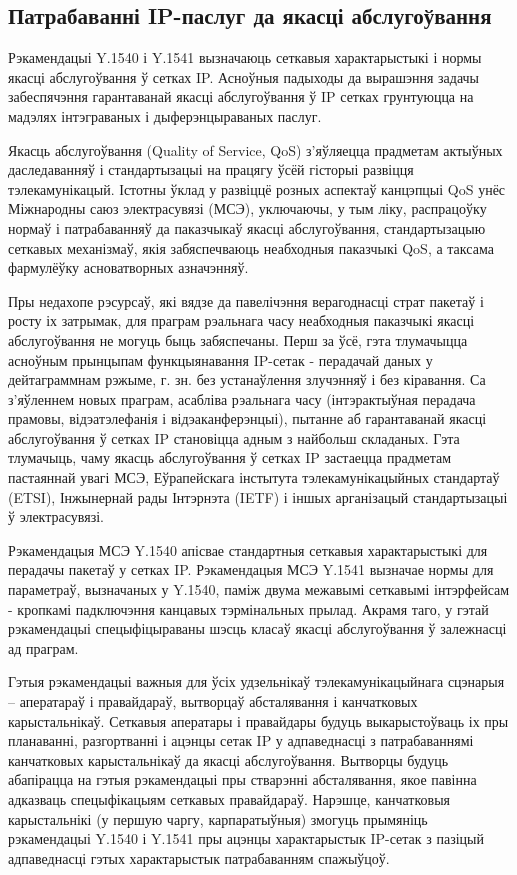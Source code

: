 \subsection{Патрабаванні IP-паслуг да якасці абслугоўвання}

Рэкамендацыі Y.1540 і Y.1541 вызначаюць сеткавыя характарыстыкі і нормы якасці абслугоўвання ў сетках IP. Асноўныя падыходы да вырашэння задачы забеспячэння гарантаванай якасці абслугоўвання ў IP сетках грунтуюцца на мадэлях інтэграваных і дыферэнцыраваных паслуг.

Якасць абслугоўвання (Quality of Service, QoS) з'яўляецца прадметам актыўных даследаванняў і стандартызацыі на працягу ўсёй гісторыі развіцця тэлекамунікацый. Істотны ўклад у развіццё розных аспектаў канцэпцыі QoS унёс Міжнародны саюз электрасувязі (МСЭ), уключаючы, у тым ліку, распрацоўку нормаў і патрабаванняў да паказчыкаў якасці абслугоўвання, стандартызацыю сеткавых механізмаў, якія забяспечваюць неабходныя паказчыкі QoS, а таксама фармулёўку асноватворных азначэнняў.

Пры недахопе рэсурсаў, які вядзе да павелічэння верагоднасці страт пакетаў і росту іх затрымак, для праграм рэальнага часу неабходныя паказчыкі якасці абслугоўвання не могуць быць забяспечаны. Перш за ўсё, гэта тлумачыцца асноўным прынцыпам функцыянавання IP-сетак - перадачай даных у дейтаграммнам рэжыме, г. зн. без устанаўлення злучэнняў і без кіравання. Са з'яўленнем новых праграм, асабліва рэальнага часу (інтэрактыўная перадача прамовы, відэатэлефанія і відэаканферэнцыі), пытанне аб гарантаванай якасці абслугоўвання ў сетках IP становіцца адным з найбольш складаных. Гэта тлумачыць, чаму якасць абслугоўвання ў сетках IP застаецца прадметам пастаяннай увагі МСЭ, Еўрапейскага інстытута тэлекамунікацыйных стандартаў (ETSI), Інжынернай рады Інтэрнэта (IETF) і іншых арганізацый стандартызацыі ў электрасувязі.

Рэкамендацыя МСЭ Y.1540 апісвае стандартныя сеткавыя характарыстыкі для перадачы пакетаў у сетках IP. Рэкамендацыя МСЭ Y.1541 вызначае нормы для параметраў, вызначаных у Y.1540, паміж двума межавымі сеткавымі інтэрфейсам - кропкамі падключэння канцавых тэрмінальных прылад. Акрамя таго, у гэтай рэкамендацыі спецыфіцыраваны шэсць класаў якасці абслугоўвання ў залежнасці ад праграм.

Гэтыя рэкамендацыі важныя для ўсіх удзельнікаў тэлекамунікацыйнага сцэнарыя -- аператараў і правайдараў, вытворцаў абсталявання і канчатковых карыстальнікаў. Сеткавыя аператары і правайдары будуць выкарыстоўваць іх пры планаванні, разгортванні і ацэнцы сетак IP у адпаведнасці з патрабаваннямі канчатковых карыстальнікаў да якасці абслугоўвання. Вытворцы будуць абапірацца на гэтыя рэкамендацыі пры стварэнні абсталявання, якое павінна адказваць спецыфікацыям сеткавых правайдараў. Нарэшце, канчатковыя карыстальнікі (у першую чаргу, карпаратыўныя) змогуць прымяніць рэкамендацыі Y.1540 і Y.1541 пры ацэнцы характарыстык IP-сетак з пазіцый адпаведнасці гэтых характарыстык патрабаванням спажыўцоў.

